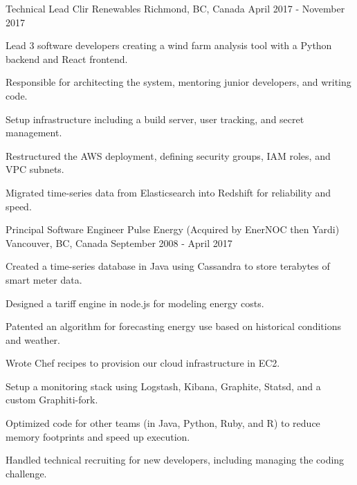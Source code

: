 \begin{cventries}
  \cventry
    {Technical Lead} %
    {Clir Renewables} %
    {Richmond, BC, Canada} %
    {April 2017 - November 2017} %
    {
      \begin{cvitems} %
        \item {Lead 3 software developers creating a wind farm analysis tool with a Python backend and React frontend.}
        \item {Responsible for architecting the system, mentoring junior developers, and writing code.}
        \item {Setup infrastructure including a build server, user tracking, and secret management.}
        \item {Restructured the AWS deployment, defining security groups, IAM roles, and VPC subnets.}
        \item {Migrated time-series data from Elasticsearch into Redshift for reliability and speed.}
      \end{cvitems}
    }


  \cventry
    {Principal Software Engineer} %
    {Pulse Energy (Acquired by EnerNOC then Yardi)} %
    {Vancouver, BC, Canada} %
    {September 2008 - April 2017} %
    {
      \begin{cvitems} %
        \item {Created a time-series database in Java using Cassandra to store terabytes of smart meter data.}
        \item {Designed a tariff engine in node.js for modeling energy costs.}
        \item {Patented an algorithm for forecasting energy use based on historical conditions and weather.}
        \item {Wrote Chef recipes to provision our cloud infrastructure in EC2.}
        \item {Setup a monitoring stack using Logstash, Kibana, Graphite, Statsd, and a custom Graphiti-fork.}
        \item {Optimized code for other teams (in Java, Python, Ruby, and R) to reduce memory footprints and speed up execution.}
        \item {Handled technical recruiting for new developers, including managing the coding challenge.}
      \end{cvitems}
    }


\end{cventries}
